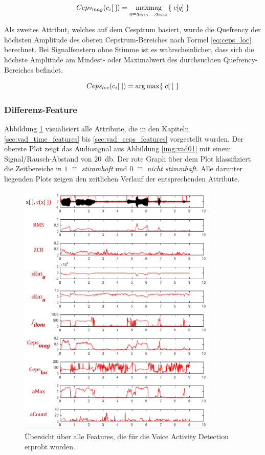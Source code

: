 \begin{equation}
Ceps_{mag}(c_i[\;]) = \operatorname*{max mag}_{q = q_{min} \ldots , q_{max}}\{ \; c[q] \; \}
\label{eq:ceps_maxpeak}
\end{equation}

Als zweites Attribut, welches auf dem Cesptrum basiert, wurde die Quefrency der höchsten Amplitude des oberen Cepstrum-Bereiches nach Formel \ref{eq:ceps_loc} berechnet. Bei Signalfenstern ohne Stimme ist es wahrscheinlicher, dass sich die höchste Amplitude am Mindest- oder Maximalwert des durchsuchten Quefrency-Bereiches befindet.

\begin{equation}
Ceps_{loc}(c_i[\;]) = \operatorname*{arg\,max} \{ \; c[\;] \; \}
\label{eq:ceps_loc}
\end{equation}	

\subsubsection{Differenz-Feature}
\label{sec:vad_dif_feature}

Abbildung \ref{img:vadAllFeatures} visualisiert alle Attribute, die in den Kapiteln \ref{sec:vad_time_features} bis \ref{sec:vad_ceps_features} vorgestellt wurden. Der oberste Plot zeigt das Audiosignal aus Abbildung \ref{img:vad01} mit einem Signal/Rausch-Abstand von \SI{20}{\decibel}. Der rote Graph über dem Plot klassifiziert die Zeitbereiche in $1 \; \hat{=} $ \emph{stimmhaft} und $0 \; \hat{=}$ \emph{nicht stimmhaft}. Alle darunter liegenden Plots zeigen den zeitlichen Verlauf der entsprechenden Attribute.

\begin{figure}[h]
	\centering
	\includegraphics[width=0.85\textwidth]{bilder/allFeatures01.png}
	\caption{Übersicht über alle Features, die für die Voice Activity Detection erprobt wurden.}
	\label{img:vadAllFeatures}
\end{figure}

